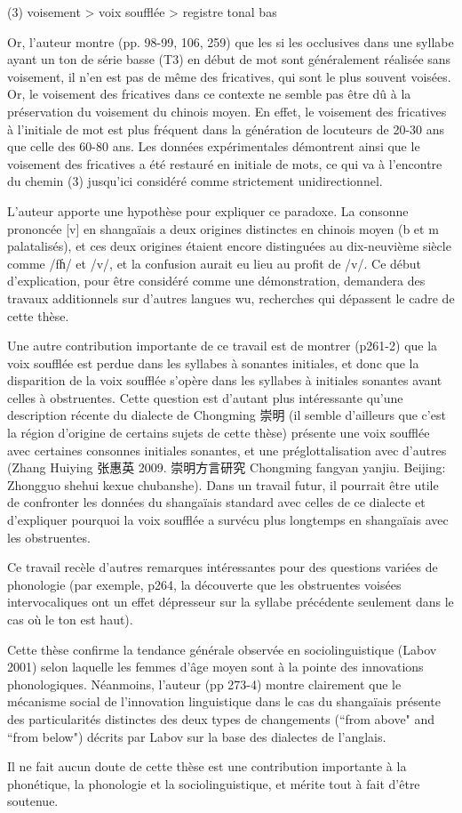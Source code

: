 \documentclass[oldfontcommands,oneside,a4paper,11pt]{article}
\newcommand{\zh}[1]{{\cn #1}}
\begin{document}
(3) voisement > voix soufflée > registre tonal bas

Or, l'auteur montre (pp. 98-99, 106, 259) que les si les occlusives dans une syllabe ayant un ton de série basse (T3) en début de mot sont généralement réalisée sans voisement, il n'en est pas de même des fricatives, qui sont le plus souvent voisées. Or, le voisement des fricatives dans ce contexte ne semble pas être dû à la préservation du voisement du chinois moyen. En effet, le voisement des fricatives à l'initiale de mot est plus fréquent dans la génération de locuteurs de 20-30 ans que celle des 60-80 ans. Les données expérimentales démontrent ainsi que le voisement des fricatives a été restauré en initiale de mots, ce qui va à l'encontre du chemin (3) jusqu'ici considéré comme strictement unidirectionnel. 

L'auteur apporte une hypothèse pour expliquer ce paradoxe. La consonne prononcée [v] en shangaïais a deux origines distinctes en chinois moyen (b et m palatalisés), et ces deux origines étaient encore distinguées au dix-neuvième siècle comme /fɦ/ et /v/, et la confusion aurait eu lieu au profit de /v/. Ce début d'explication, pour être considéré comme une démonstration, demandera des travaux additionnels sur d'autres langues wu, recherches qui dépassent le cadre de cette thèse.

Une autre contribution importante de ce travail est de montrer (p261-2) que la voix soufflée est perdue dans les syllabes à sonantes initiales, et donc que la disparition de la voix soufflée s'opère dans les syllabes à initiales sonantes avant celles à obstruentes. Cette question est d'autant plus intéressante qu'une description récente du dialecte de Chongming \zh{崇明} (il semble d'ailleurs que c'est la région d'origine de certains sujets de cette thèse) présente une voix soufflée avec certaines consonnes initiales sonantes, et une préglottalisation avec d'autres (Zhang Huiying \zh{张惠英} 2009. \zh{崇明方言研究} Chongming fangyan yanjiu. Beijing: Zhongguo shehui kexue chubanshe). Dans un travail futur, il pourrait être utile de confronter les données du shangaïais standard avec celles de ce dialecte et d'expliquer pourquoi la voix soufflée a survécu plus longtemps en shangaïais avec les obstruentes.

Ce travail recèle d'autres remarques intéressantes pour des questions variées de phonologie (par exemple, p264, la découverte que les obstruentes voisées intervocaliques ont un effet dépresseur sur la syllabe précédente seulement dans le cas où le ton est haut).

Cette thèse confirme la tendance générale observée en sociolinguistique (Labov 2001) selon laquelle les femmes d'âge moyen sont à la pointe des innovations phonologiques. Néanmoins, l'auteur (pp 273-4) montre clairement que le mécanisme social de l'innovation linguistique dans le cas du shangaïais présente des particularités distinctes des deux types de changements (``from above" and ``from below") décrits par Labov sur la base des dialectes de l'anglais.

Il ne fait aucun doute de cette thèse est une contribution importante à la phonétique, la phonologie et la sociolinguistique, et mérite tout à fait d'être soutenue.

 


\end{document}
